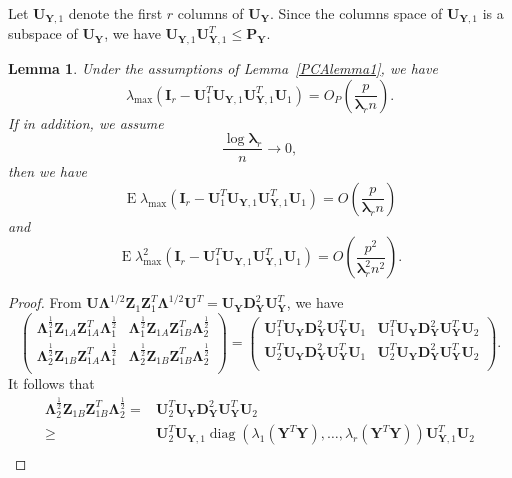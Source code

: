 \documentclass[12pt]{article} %
\DeclareMathOperator{\mydiag}{diag}
\DeclareMathOperator{\myE}{E}
\newcommand{\bZ}{\mathbf{Z}}
\newcommand{\bP}{\mathbf{P}}
\newcommand{\bY}{\mathbf{Y}}
\newcommand{\bI}{\mathbf{I}}
\newcommand{\bU}{\mathbf{U}}
\newcommand{\bD}{\mathbf{D}}
\newcommand{\bfsym}[1]{\ensuremath{\boldsymbol{#1}}}
\def\blambda {\bfsym {\lambda}}
\def\bLambda {\bfsym {\Lambda}}
\newtheorem{lemma}{Lemma}
\theoremstyle{definition}
\begin{document}
\begin{appendices}
Let $\bU_{\bY,1}$ denote the first $r$ columns of $\bU_{\bY}$.
Since the columns space of $\bU_{\bY,1}$ is a subspace of $\bU_{\bY}$, we have $\bU_{\bY,1}\bU_{\bY,1}^T\leq \bP_{\bY}$.
\begin{lemma}\label{PCAlemma2}
    Under the assumptions of Lemma~\ref{PCAlemma1}, we have
$$
\lambda_{\max}(\bI_r-\bU_1^T \bU_{\bY,1}\bU_{\bY,1}^T \bU_1)
=O_P(\frac{ p}{\blambda_r n}).
$$
If in addition, we assume
    \begin{equation}\label{newCondition}
        \frac{\log \blambda_r}{n}\to 0,
    \end{equation}
     then we have
$$
\myE\lambda_{\max}(\bI_r-\bU_1^T \bU_{\bY,1}\bU_{\bY,1}^T \bU_1)
=O(\frac{ p}{\blambda_r n})
$$
and
$$
\myE\lambda_{\max}^2(\bI_r-\bU_1^T \bU_{\bY,1}\bU_{\bY,1}^T \bU_1)
=O(\frac{ p^2}{\blambda_r^2 n^2}).
$$
\end{lemma}
\begin{proof}
    From
$
\bU\bLambda^{1/2} \bZ_1 \bZ_1^T \bLambda^{1/2} \bU^T 
=\bU_{\bY}\bD_{\bY}^2 \bU_{\bY}^T
$,
we have
$$
    \begin{pmatrix}        
        \bLambda_{1}^{\frac{1}{2}}\bZ_{1A} \bZ_{1A}^T \bLambda_1^{\frac{1}{2}}&
        \bLambda_{1}^{\frac{1}{2}} \bZ_{1A}\bZ_{1B}^T\bLambda_2^{\frac{1}{2}}\\
        \bLambda_{2}^{\frac{1}{2}} \bZ_{1B} \bZ_{1A}^T\bLambda_1^{\frac{1}{2}} &
        \bLambda_{2}^{\frac{1}{2}}\bZ_{1B}\bZ_{1B}^T\bLambda_2^{\frac{1}{2}}\\
    \end{pmatrix}
    =
    \begin{pmatrix}        
         \bU_1^T \bU_{\bY}\bD_{\bY}^2 \bU_{\bY}^T \bU_1&
         \bU_1^T \bU_{\bY}\bD_{\bY}^2 \bU_{\bY}^T \bU_2\\
        \bU_2^T \bU_{\bY}\bD_{\bY}^2 \bU_{\bY}^T \bU_1&
         \bU_2^T \bU_{\bY}\bD_{\bY}^2 \bU_{\bY}^T \bU_2\\
    \end{pmatrix}.
$$
It follows that
$$
\begin{aligned}
 \bLambda_{2}^{\frac{1}{2}}\bZ_{1B} \bZ_{1B}^T  \bLambda_{2}^{\frac{1}{2}}
    =&
         \bU_2^T \bU_{\bY}\bD_{\bY}^2 \bU_{\bY}^T \bU_2\\
\geq&
     \bU_{2}^T \bU_{\bY,1}\mydiag(\lambda_1(\bY^T \bY),\ldots,\lambda_r(\bY^T \bY))\bU_{\bY,1}^T \bU_{2}\\

\end{aligned}$$
\end{proof}
\end{appendices}
\end{document}
